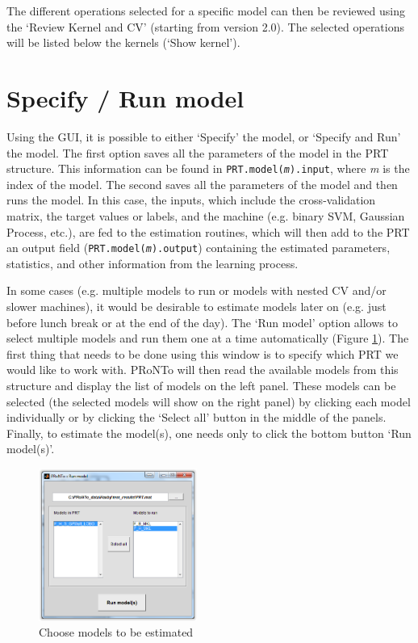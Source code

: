 The different operations selected for a specific model can then be reviewed using the `Review Kernel and CV' (starting from version 2.0). The selected operations will be listed below the kernels (`Show kernel').

\section{Specify / Run model}

Using the GUI, it is possible to either `Specify' the model, or `Specify and Run' the model. The first option saves all the parameters of the model in the PRT structure. This information can be found in \texttt{PRT.model(\textit{m}).input}, where \textit{m} is the index of the model. The second saves all the parameters of the model and then runs the model. In this case, the inputs, which include the cross-validation matrix, the target values or labels, and the machine (e.g. binary SVM, Gaussian Process, etc.), are fed to the estimation routines, which will then add to the PRT an output field (\texttt{PRT.model(\textit{m}).output}) containing the estimated parameters, statistics, and other information from the learning process.

In some cases (e.g. multiple models to run or models with nested CV and/or slower machines), it would be desirable to estimate models later on (e.g. just before lunch break or at the end of the day). The `Run model' option allows to select multiple models and run them one at a time automatically (Figure \ref{fig_run_model}). The first thing that needs to be done using this window is to specify which PRT we would like to work with. PRoNTo will then read the available models from this structure and display the list of models on the left panel. These models can be selected (the selected models will show on the right panel) by clicking each model individually or by clicking the `Select all' button in the middle of the panels. Finally, to estimate the model(s), one needs only to click the bottom button `Run model(s)'.

\begin{figure}[!h]
\begin{center}
\includegraphics[height=5cm]{images/prt_run_model.PNG}
\caption{Choose models to be estimated}
 \label{fig_run_model}
\end{center}
\end{figure}

